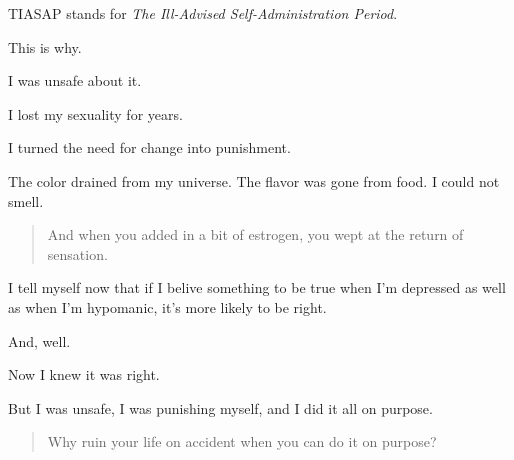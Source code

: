 TIASAP stands for \emph{The Ill-Advised Self-Administration Period}.

This is why.

I was unsafe about it.

I lost my sexuality for years.

I turned the need for change into punishment.

The color drained from my universe. The flavor was gone from food. I could not smell.

\begin{quote}
And when you added in a bit of estrogen, you wept at the return of sensation.
\end{quote}

I tell myself now that if I belive something to be true when I'm depressed as well as when I'm hypomanic, it's more likely to be right.

And, well.

Now I knew it was right.

But I was unsafe, I was punishing myself, and I did it all on purpose.

\begin{quote}
Why ruin your life on accident when you can do it on purpose?
\end{quote}

